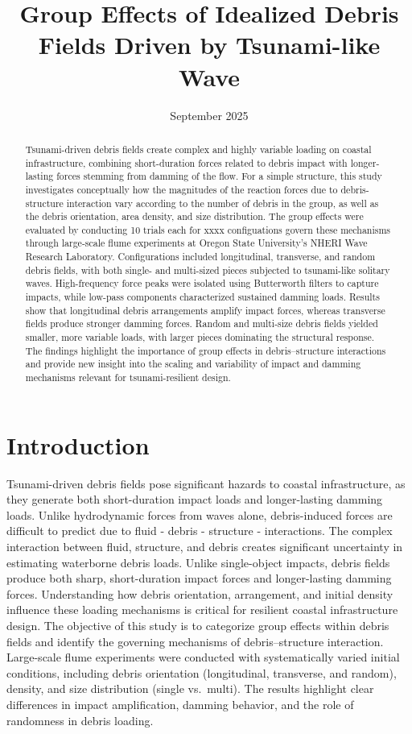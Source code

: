 \documentclass{article}
\title{Group Effects of Idealized Debris Fields Driven by Tsunami-like Wave}
\date{September 2025}
\begin{document}
\maketitle
\begin{abstract}
Tsunami-driven debris fields create complex and highly variable loading on coastal infrastructure, combining short-duration forces related to debris impact with longer-lasting forces stemming from damming of the flow. For a simple structure, this study investigates conceptually how the magnitudes of the reaction forces due to debris-structure interaction vary according to the number of debris in the group, as well as the debris orientation, area density, and size distribution. The group effects were evaluated by conducting 10 trials each for xxxx configuations govern these mechanisms through large-scale flume experiments at Oregon State University’s NHERI Wave Research Laboratory. Configurations included longitudinal, transverse, and random debris fields, with both single- and multi-sized pieces subjected to tsunami-like solitary waves. High-frequency force peaks were isolated using Butterworth filters to capture impacts, while low-pass components characterized sustained damming loads. Results show that longitudinal debris arrangements amplify impact forces, whereas transverse fields produce stronger damming forces. Random and multi-size debris fields yielded smaller, more variable loads, with larger pieces dominating the structural response. The findings highlight the importance of group effects in debris–structure interactions and provide new insight into the scaling and variability of impact and damming mechanisms relevant for tsunami-resilient design.
\end{abstract}

\section{Introduction}
Tsunami-driven debris fields pose significant hazards to coastal infrastructure, as they generate both short-duration impact loads and longer-lasting damming loads. Unlike hydrodynamic forces from waves alone, debris-induced forces are difficult to predict due to fluid - debris - structure - interactions. The complex interaction between fluid, structure, and debris creates significant uncertainty in estimating waterborne debris loads. Unlike single-object impacts, debris fields produce both sharp, short-duration impact forces and longer-lasting damming forces. Understanding how debris orientation, arrangement, and initial density influence these loading mechanisms is critical for resilient coastal infrastructure design. The objective of this study is to categorize group effects within debris fields and identify the governing mechanisms of debris–structure interaction. Large-scale flume experiments were conducted with systematically varied initial conditions, including debris orientation (longitudinal, transverse, and random), density, and size distribution (single vs.\ multi). The results highlight clear differences in impact amplification, damming behavior, and the role of randomness in debris loading.
\end{document}
